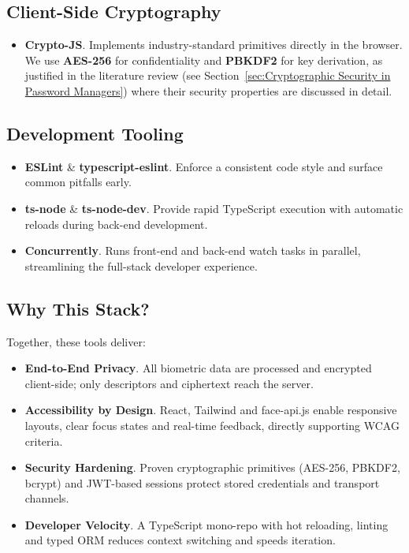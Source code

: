 \subsection*{Client-Side Cryptography}
\begin{itemize}
  \item \textbf{Crypto-JS}. Implements industry-standard primitives directly in the browser. We use \textbf{AES-256} for confidentiality and \textbf{PBKDF2} for key derivation, as justified in the literature review (see Section~\ref{sec:Cryptographic Security in Password Managers}) where their security properties are discussed in detail.
\end{itemize}

\subsection*{Development Tooling}
\begin{itemize}
  \item \textbf{ESLint} \& \textbf{typescript-eslint}. Enforce a consistent code style and surface common pitfalls early.
  \item \textbf{ts-node} \& \textbf{ts-node-dev}. Provide rapid TypeScript execution with automatic reloads during back-end development.
  \item \textbf{Concurrently}. Runs front-end and back-end watch tasks in parallel, streamlining the full-stack developer experience.
\end{itemize}

\subsection*{Why This Stack?}
Together, these tools deliver:

\begin{itemize}
  \item \textbf{End-to-End Privacy}. All biometric data are processed and encrypted client-side; only descriptors and ciphertext reach the server.
  \item \textbf{Accessibility by Design}. React, Tailwind and face-api.js enable responsive layouts, clear focus states and real-time feedback, directly supporting WCAG criteria.
  \item \textbf{Security Hardening}. Proven cryptographic primitives (AES-256, PBKDF2, bcrypt) and JWT-based sessions protect stored credentials and transport channels.
  \item \textbf{Developer Velocity}. A TypeScript mono-repo with hot reloading, linting and typed ORM reduces context switching and speeds iteration.
\end{itemize}



